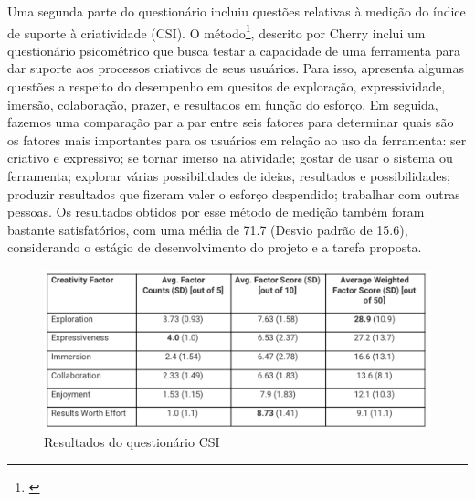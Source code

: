 Uma segunda parte do questionário incluiu questões relativas à medição do índice de suporte à criatividade (CSI). O método\footnote{\cite{Cherry2014}}, descrito por Cherry inclui um questionário psicométrico que busca testar a capacidade de uma ferramenta para dar suporte aos processos criativos de seus usuários. Para isso, apresenta algumas questões a respeito do desempenho em quesitos de exploração, expressividade, imersão, colaboração, prazer, e resultados em função do esforço. Em seguida, fazemos uma comparação par a par entre seis fatores para determinar quais são os fatores mais importantes para os usuários em relação ao uso da ferramenta: ser criativo e expressivo; se tornar imerso na atividade; gostar de usar o sistema ou ferramenta; explorar várias possibilidades de ideias, resultados e possibilidades; produzir resultados que fizeram valer o esforço despendido; trabalhar com outras pessoas. Os resultados obtidos por esse método de medição também foram bastante satisfatórios, com uma média de 71.7 (Desvio padrão de 15.6), considerando o estágio de desenvolvimento do projeto e a tarefa proposta.


\begin{figure}

\includegraphics[width=1\textwidth]{pictures/cap4/CSI}
\caption{Resultados do questionário CSI}
\label{fig:questionnairecsi}
\end{figure}


 

